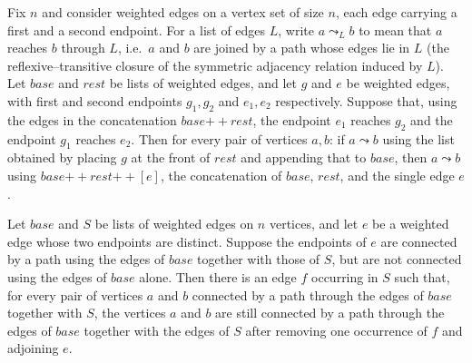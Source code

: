 \begin{lemma}
\label{Kruskal.exchange_take_head'}
\leanok
{}
Fix $n$ and consider weighted edges on a vertex set of size $n$, each edge carrying a
first and a second endpoint. For a list of edges $L$, write $a \leadsto_L b$ to mean
that $a$ reaches $b$ through $L$, i.e.\ $a$ and $b$ are joined by a path whose edges lie
in $L$ (the reflexive–transitive closure of the symmetric adjacency relation induced by
$L$). Let $\mathit{base}$ and $\mathit{rest}$ be lists of weighted edges, and let $g$
and $e$ be weighted edges, with first and second endpoints $g_1, g_2$ and $e_1, e_2$
respectively. Suppose that, using the edges in the concatenation $\mathit{base}
\mathbin{+\!\!+} \mathit{rest}$, the endpoint $e_1$ reaches $g_2$ and the endpoint $g_1$
reaches $e_2$. Then for every pair of vertices $a, b$: if $a \leadsto b$ using the list
obtained by placing $g$ at the front of $\mathit{rest}$ and appending that to
$\mathit{base}$, then $a \leadsto b$ using $\mathit{base} \mathbin{+\!\!+} \mathit{rest}
\mathbin{+\!\!+} [e]$, the concatenation of $\mathit{base}$, $\mathit{rest}$, and the
single edge $e$.
\end{lemma}

\begin{lemma}
\label{Kruskal.exchange_with_base}
\leanok
{}
Let $\mathit{base}$ and $S$ be lists of weighted edges on $n$ vertices, and let $e$ be a
weighted edge whose two endpoints are distinct. Suppose the endpoints of $e$ are
connected by a path using the edges of $\mathit{base}$ together with those of $S$, but
are not connected using the edges of $\mathit{base}$ alone. Then there is an edge $f$
occurring in $S$ such that, for every pair of vertices $a$ and $b$ connected by a path
through the edges of $\mathit{base}$ together with $S$, the vertices $a$ and $b$ are
still connected by a path through the edges of $\mathit{base}$ together with the edges
of $S$ after removing one occurrence of $f$ and adjoining $e$.
\end{lemma}

